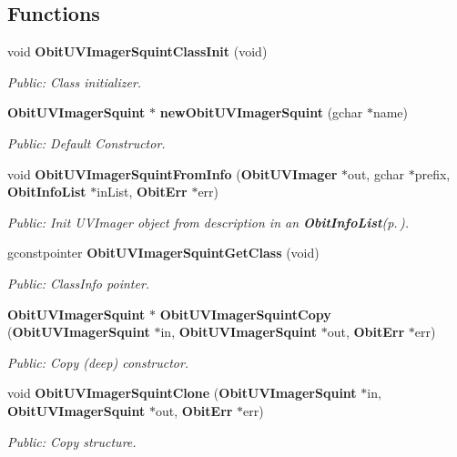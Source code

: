 \subsection*{Functions}
\begin{CompactItemize}
\item 
void {\bf Obit\-UVImager\-Squint\-Class\-Init} (void)
\begin{CompactList}\small\item\em Public: Class initializer. \item\end{CompactList}\item 
{\bf Obit\-UVImager\-Squint} $\ast$ {\bf new\-Obit\-UVImager\-Squint} (gchar $\ast$name)
\begin{CompactList}\small\item\em Public: Default Constructor. \item\end{CompactList}\item 
void {\bf Obit\-UVImager\-Squint\-From\-Info} ({\bf Obit\-UVImager} $\ast$out, gchar $\ast$prefix, {\bf Obit\-Info\-List} $\ast$in\-List, {\bf Obit\-Err} $\ast$err)
\begin{CompactList}\small\item\em Public: Init UVImager object from description in an {\bf Obit\-Info\-List}{\rm (p.\,\pageref{structObitInfoList})}. \item\end{CompactList}\item 
gconstpointer {\bf Obit\-UVImager\-Squint\-Get\-Class} (void)
\begin{CompactList}\small\item\em Public: Class\-Info pointer. \item\end{CompactList}\item 
{\bf Obit\-UVImager\-Squint} $\ast$ {\bf Obit\-UVImager\-Squint\-Copy} ({\bf Obit\-UVImager\-Squint} $\ast$in, {\bf Obit\-UVImager\-Squint} $\ast$out, {\bf Obit\-Err} $\ast$err)
\begin{CompactList}\small\item\em Public: Copy (deep) constructor. \item\end{CompactList}\item 
void {\bf Obit\-UVImager\-Squint\-Clone} ({\bf Obit\-UVImager\-Squint} $\ast$in, {\bf Obit\-UVImager\-Squint} $\ast$out, {\bf Obit\-Err} $\ast$err)
\begin{CompactList}\small\item\em Public: Copy structure. \item\end{CompactList}\item 

\end{CompactItemize}
